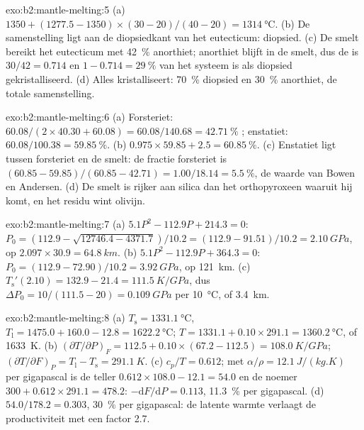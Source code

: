 \begin{solution}{exo:b2:mantle-melting:5}
(a) $1350 + (1277.5 - 1350)\times(30 - 20)/(40 - 20) = \qty{1314}{\celsius}$.
(b) De samenstelling ligt aan de diopsiedkant van het eutecticum: diopsied.
(c) De smelt bereikt het eutecticum met \qty{42}{\percent} anorthiet; anorthiet
blijft in de smelt, dus de  is $30/42 = 0.714$ en $1 - 0.714 =
\qty{29}{\percent}$ van het systeem is als diopsied gekristalliseerd. (d) Alles
kristalliseert: \qty{70}{\percent} diopsied en \qty{30}{\percent} anorthiet, de
totale samenstelling.
\end{solution}

\begin{solution}{exo:b2:mantle-melting:6}
(a) Forsteriet: $60.08/(2\times40.30 + 60.08) = 60.08/140.68 =
\qty{42.71}{\percent}$ ; enstatiet: $60.08/100.38 = \qty{59.85}{\percent}$.
(b) $0.975\times59.85 + 2.5 = \qty{60.85}{\percent}$. (c) Enstatiet ligt tussen
forsteriet en de smelt: de fractie forsteriet is $(60.85 - 59.85)/(60.85 -
42.71) = 1.00/18.14 = \qty{5.5}{\percent}$, de waarde van Bowen en Andersen. (d) De
smelt is rijker aan silica dan het orthopyroxeen waaruit hij komt, en het residu
wint olivijn.
\end{solution}

\begin{solution}{exo:b2:mantle-melting:7}
(a) $5.1P^2 - 112.9P + 214.3 = 0$: $P_0 = (112.9 - \sqrt{12746.4 -
4371.7})/10.2 = (112.9 - 91.51)/10.2 = \qty{2.10}{GPa}$, op $2.097\times30.9 =
\qty{64.8}{km}$. (b) $5.1P^2 - 112.9P + 364.3 = 0$: $P_0 = (112.9 -
72.90)/10.2 = \qty{3.92}{GPa}$, op \qty{121}{km}. (c) $T_{\mathrm s}'(2.10) = 132.9
- 21.4 = \qty{111.5}{K/GPa}$, dus $\Delta P_0 = 10/(111.5 - 20) = \qty{0.109}{GPa}$
per \qty{10}{\celsius}, of \qty{3.4}{km}.
\end{solution}

\begin{solution}{exo:b2:mantle-melting:8}
(a) $T_{\mathrm s} = \qty{1331.1}{\celsius}$, $T_{\mathrm l} = 1475.0 + 160.0 -
12.8 = \qty{1622.2}{\celsius}$; $T = 1331.1 + 0.10\times291.1 =
\qty{1360.2}{\celsius}$, of \qty{1633}{K}. (b) $(\partial T/\partial P)_F = 112.5
+ 0.10\times(67.2 - 112.5) = \qty{108.0}{K/GPa}$; $(\partial T/\partial F)_P =
T_{\mathrm l} - T_{\mathrm s} = \qty{291.1}{K}$. (c) $c_p/T = 0.612$; met $\alpha/\rho
= \qty{12.1}{J/(kg.K)}$ per gigapascal is de teller $0.612\times108.0 - 12.1
= 54.0$ en de noemer $300 + 0.612\times291.1 = 478.2$: $-\mathrm dF/\mathrm
dP = 0.113$, \qty{11.3}{\percent} per gigapascal. (d) $54.0/178.2 = 0.303$,
\qty{30}{\percent} per gigapascal: de latente warmte verlaagt de productiviteit met een
factor 2.7.
\end{solution}

